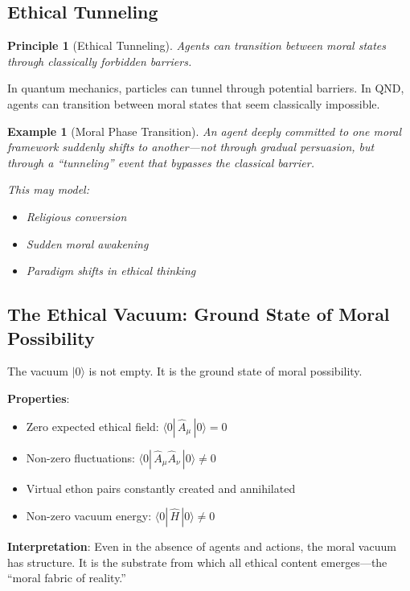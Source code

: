 \documentclass[12pt]{article}
\newtheorem{principle}{Principle}
\newtheorem{example}{Example}[section]
\begin{document}
\subsection{Ethical Tunneling}

\begin{principle}[Ethical Tunneling]
\emph{Agents can transition between moral states through classically forbidden barriers.}
\end{principle}

In quantum mechanics, particles can tunnel through potential barriers. In QND, agents can transition between moral states that seem classically impossible.

\begin{example}[Moral Phase Transition]
An agent deeply committed to one moral framework suddenly shifts to another---not through gradual persuasion, but through a ``tunneling'' event that bypasses the classical barrier.

This may model:
\begin{itemize}
    \item Religious conversion
    \item Sudden moral awakening
    \item Paradigm shifts in ethical thinking
\end{itemize}
\end{example}

\subsection{The Ethical Vacuum: Ground State of Moral Possibility}

The vacuum $|0\rangle$ is not empty. It is the ground state of moral possibility.

\textbf{Properties}:
\begin{itemize}
    \item Zero expected ethical field: $\langle 0| \,\hat{A}_\mu\, |0\rangle = 0$
    \item Non-zero fluctuations: $\langle 0| \,\hat{A}_\mu \hat{A}_\nu\, |0\rangle \neq 0$
    \item Virtual ethon pairs constantly created and annihilated
    \item Non-zero vacuum energy: $\langle 0| \,\hat{H}\, |0\rangle \neq 0$
\end{itemize}

\textbf{Interpretation}: Even in the absence of agents and actions, the moral vacuum has structure. It is the substrate from which all ethical content emerges---the ``moral fabric of reality.''
\end{document}
